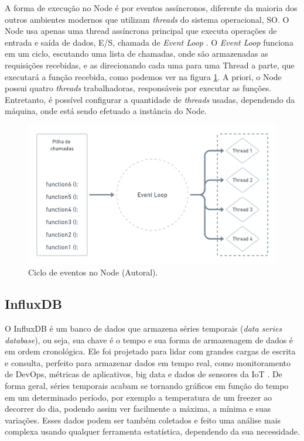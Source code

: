 A forma de execução no Node é por eventos assíncronos, diferente da maioria dos outros ambientes modernos que utilizam \textit{threads} do sistema operacional, SO. O Node usa apenas uma thread assíncrona principal que executa operações de entrada e saída de dados, E/S, chamada de \textit{Event Loop} \cite{nodejsAbout}. O \textit{Event Loop} funciona em um ciclo, escutando uma lista de chamadas, onde são armazenadas as requisições recebidas, e as direcionando cada uma para uma Thread a parte, que executará a função recebida, como podemos ver na figura \ref{fig:event-loop-node}. A priori, o  Node possui quatro \textit{threads} trabalhadoras, responsáveis por executar as funções. Entretanto, é possível configurar a quantidade de \textit{threads} usadas, dependendo da máquina, onde está sendo efetuado a instância do Node.

\begin{figure}[H]
  \centering
  \includegraphics[width=.80\textwidth]{assets/event-loop-node.png} 
  \caption{Ciclo de eventos no Node (Autoral).}
  \label{fig:event-loop-node} 
\end{figure}

\subsection{InfluxDB}
\label{fund:influxdb}
O InfluxDB é um banco de dados que armazena séries temporais (\textit{data series database}), ou seja, sua chave é o tempo e sua forma de armazenagem de dados é em ordem cronológica. Ele foi projetado para lidar com grandes cargas de escrita e consulta, perfeito para armazenar dados em tempo real, como monitoramento de DevOps, métricas de aplicativos, big data e dados de sensores da IoT \cite{giacobbe2018implementation}. De forma geral, séries temporais acabam se tornando gráficos em função do tempo em um determinado período, por exemplo a temperatura de um freezer ao decorrer do dia, podendo assim ver facilmente a máxima, a mínima e suas variações. Esses dados podem ser também coletados e feito uma análise mais complexa usando qualquer ferramenta estatística, dependendo da sua necessidade.


